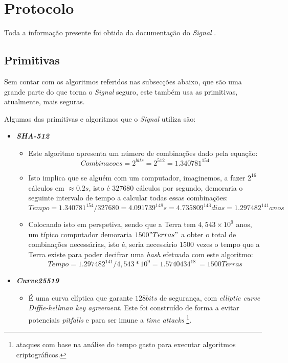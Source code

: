 \section{Protocolo}
Toda a informação presente foi obtida da documentação do \textit{Signal} \cite{signal}.

\subsection{Primitivas}
Sem contar com os algoritmos referidos nas subsecções abaixo, que são uma grande parte do que torna o \textit{Signal} seguro, este também usa as primitivas, atualmente, mais seguras.

Algumas das primitivas e algoritmos que o \textit{Signal} utiliza são:
\begin{itemize}
    \item \textbf{\textit{SHA-512}}
    \begin{itemize}
        \item Este algoritmo apresenta um número de combinações dado pela equação:
        \begin{equation}
            Combinacoes=2^{bits}=2^{512}=1.340781^{154}
        \end{equation}

        \item Isto implica que se alguém com um computador, imaginemos, a fazer $2^{16}$ cálculos em $\approx 0.2s$, isto é $327680$ cálculos por segundo, demoraria o seguinte intervalo de tempo a calcular todas essas combinações:
        \begin{equation}
            Tempo = 1.340781^{154} / 327680 = 4.091739^{148}s = 4.735809^{143} dias = 1.297482^{141} anos
        \end{equation}

        \item Colocando isto em perspetiva, sendo que a Terra tem $4,543\times10^9$ anos, um típico computador demoraria $1500 "Terras"$ a obter o total de combinações necessárias, isto é, seria necessário $1500$ vezes o tempo que a Terra existe para poder decifrar uma \textit{hash} efetuada com este algoritmo:
        \begin{equation}
        Tempo = 1.297482^{141} /4,543*10^{9} = 1.5740434^{18} ~= 1500 Terras
        \end{equation}
    \end{itemize}

    \item \textit{\textbf{Curve25519}}
    \begin{itemize}
        \item É uma curva elíptica que garante $128 bits$ de segurança, com \textit{elliptic curve Diffie-hellman key agreement}. Este foi construído de forma a evitar potenciais \textit{pitfalls} e para ser imune a \textit{time attacks} \footnote{ataques com base na análise do tempo gasto para executar algoritmos criptográficos.}.
    \end{itemize}


\end{itemize}
